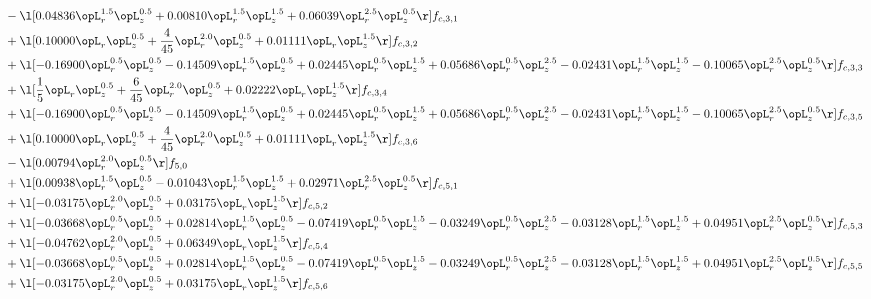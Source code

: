 \begin{alignat}{2}
& - \l[  0.04836 \opL_r^{1.5} \opL_z^{0.5} +  0.00810 \opL_r^{1.5} \opL_z^{1.5} +  0.06039 \opL_r^{2.5} \opL_z^{0.5}  \r] f_{c,3,1} \nonumber \\ 
& + \l[  0.10000 \opL_r \opL_z^{0.5} + \frac{4}{45} \opL_r^{2.0} \opL_z^{0.5} +  0.01111 \opL_r \opL_z^{1.5}  \r] f_{c,3,2} \nonumber \\ 
& + \l[  -0.16900 \opL_r^{0.5} \opL_z^{0.5}   -0.14509 \opL_r^{1.5} \opL_z^{0.5} +  0.02445 \opL_r^{0.5} \opL_z^{1.5} +  0.05686 \opL_r^{0.5} \opL_z^{2.5}   -0.02431 \opL_r^{1.5} \opL_z^{1.5}   -0.10065 \opL_r^{2.5} \opL_z^{0.5}  \r] f_{c,3,3} \nonumber \\ 
& + \l[ \frac{1}{5} \opL_r \opL_z^{0.5} + \frac{6}{45} \opL_r^{2.0} \opL_z^{0.5} +  0.02222 \opL_r \opL_z^{1.5}  \r] f_{c,3,4} \nonumber \\ 
& + \l[  -0.16900 \opL_r^{0.5} \opL_z^{0.5}   -0.14509 \opL_r^{1.5} \opL_z^{0.5} +  0.02445 \opL_r^{0.5} \opL_z^{1.5} +  0.05686 \opL_r^{0.5} \opL_z^{2.5}   -0.02431 \opL_r^{1.5} \opL_z^{1.5}   -0.10065 \opL_r^{2.5} \opL_z^{0.5}  \r] f_{c,3,5} \nonumber \\ 
& + \l[  0.10000 \opL_r \opL_z^{0.5} + \frac{4}{45} \opL_r^{2.0} \opL_z^{0.5} +  0.01111 \opL_r \opL_z^{1.5}  \r] f_{c,3,6} \nonumber \\ 
& - \l[  0.00794 \opL_r^{2.0} \opL_z^{0.5}  \r] f_{5,0} \nonumber \\ 
& + \l[  0.00938 \opL_r^{1.5} \opL_z^{0.5}   -0.01043 \opL_r^{1.5} \opL_z^{1.5} +  0.02971 \opL_r^{2.5} \opL_z^{0.5}  \r] f_{c,5,1} \nonumber \\ 
& + \l[  -0.03175 \opL_r^{2.0} \opL_z^{0.5} +  0.03175 \opL_r \opL_z^{1.5}  \r] f_{c,5,2} \nonumber \\ 
& + \l[  -0.03668 \opL_r^{0.5} \opL_z^{0.5} +  0.02814 \opL_r^{1.5} \opL_z^{0.5}   -0.07419 \opL_r^{0.5} \opL_z^{1.5}   -0.03249 \opL_r^{0.5} \opL_z^{2.5}   -0.03128 \opL_r^{1.5} \opL_z^{1.5} +  0.04951 \opL_r^{2.5} \opL_z^{0.5}  \r] f_{c,5,3} \nonumber \\ 
& + \l[  -0.04762 \opL_r^{2.0} \opL_z^{0.5} +  0.06349 \opL_r \opL_z^{1.5}  \r] f_{c,5,4} \nonumber \\ 
& + \l[  -0.03668 \opL_r^{0.5} \opL_z^{0.5} +  0.02814 \opL_r^{1.5} \opL_z^{0.5}   -0.07419 \opL_r^{0.5} \opL_z^{1.5}   -0.03249 \opL_r^{0.5} \opL_z^{2.5}   -0.03128 \opL_r^{1.5} \opL_z^{1.5} +  0.04951 \opL_r^{2.5} \opL_z^{0.5}  \r] f_{c,5,5} \nonumber \\ 
& + \l[  -0.03175 \opL_r^{2.0} \opL_z^{0.5} +  0.03175 \opL_r \opL_z^{1.5}  \r] f_{c,5,6} \nonumber \\ 

\end{alignat}

